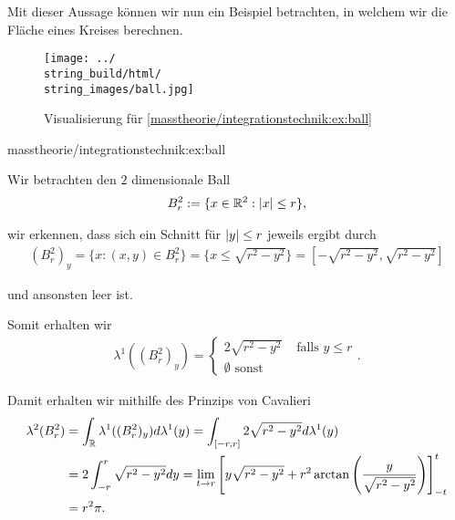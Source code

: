 \par
Mit dieser Aussage können wir nun ein Beispiel betrachten, in welchem wir die Fläche eines Kreises berechnen.

\begin{figure}[htbp]
\centering


\noindent\texttt{[image: ../\\string\_build/html/\\string\_images/ball.jpg]}
\caption{Visualisierung für \cref{masstheorie/integrationstechnik:ex:ball} }\label{\detokenize{masstheorie/integrationstechnik:fig-ball}}\end{figure}
\begin{example}{}{masstheorie/integrationstechnik:ex:ball}



\par
Wir betrachten den \(2\) dimensionale Ball
\begin{align*}
B_r^2:=\{x\in\mathbb{R}^2: |x|\leq r\},
\end{align*}
\par
wir erkennen, dass sich ein Schnitt für \(\vert y \vert\leq r\) jeweils ergibt durch
\begin{align*}
(B_r^2)_y = \{x:(x,y)\in B_r^2\} = \{x\leq\sqrt{r^2-y^2}\} = [-\sqrt{r^2-y^2},\sqrt{r^2-y^2}]
\end{align*}
\par
und ansonsten leer ist.

\par
Somit erhalten wir
\begin{align*}
\lambda^1((B_r^2)_y) = 
\begin{cases}
2 \sqrt{r^2-y^2}&\text{ falls }y\leq r\\
\emptyset\text{ sonst}
\end{cases}.
\end{align*}
\par
Damit erhalten wir mithilfe des Prinzips von Cavalieri
\begin{align*}
\lambda^2(B_r^2) &= \int_{\mathbb{R}} \lambda^1((B_r^2)_y) d\lambda^1(y) = 
\int_{[-r,r]} 2 \sqrt{r^2-y^2} d\lambda^1(y)\\
&= 
2\int_{-r}^r \sqrt{r^2 - y^2} dy = 
\lim_{t\to r}\left[y \sqrt{r^2-y^2} +r^2\arctan\left(\frac{y}{\sqrt{r^2-y^2}}\right)\right]^t_{-t}\\
&=
r^2\pi.
\end{align*}\end{example}

